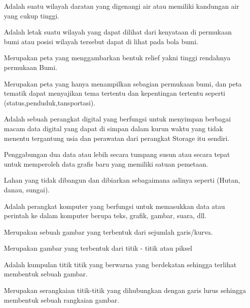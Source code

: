 Adalah suatu wilayah daratan yang digenangi air atau memiliki kandungan air yang cukup tinggi.

Adalah letak suatu wilayah yang dapat dilihat dari kenyataan di permukaan bumi atau posisi wilayah tersebut dapat di lihat pada bola bumi.

Merupakan peta yang menggambarkan bentuk relief yakni tinggi rendahnya permukaan Bumi.
 
Merupakan peta yang hanya menampilkan sebagian permukaan bumi, dan peta tematik dapat menyajikan tema tertentu dan kepentingan tertentu seperti (status,penduduk,tansportasi). 

Adalah sebuah perangkat digital yang berfungsi untuk menyimpan berbagai macam data digital yang dapat di simpan dalam kurun waktu yang tidak menentu tergantung usia dan perawatan dari perangkat Storage itu sendiri.

Penggabungan dua data atau lebih secara tumpang susun atau secara tepat untuk memperoleh data grafis baru yang memiliki satuan pemetaan.

Lahan yang tidak dibangun dan dibiarkan sebagaimana aslinya seperti (Hutan, danau, sungai).

Adalah perangkat komputer yang berfungsi untuk memasukkan data atau perintah ke dalam komputer berupa teks, grafik, gambar, suara, dll.

Merupakan sebuah gambar yang terbentuk dari sejumlah garis/kurva.

Merupakan gambar yang terbentuk dari titik - titik atau piksel

Adalah kumpulan titik titik yang berwarna yang berdekatan sehingga terlihat membentuk sebuah gambar.

Merupakan serangkaian titik-titik yang dihubungkan dengan garis lurus sehingga membentuk sebuah rangkaian gambar.
